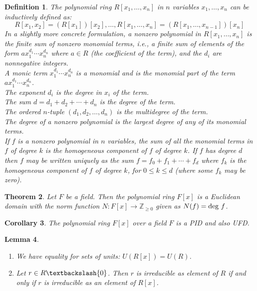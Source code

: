 \documentclass[a4paper,8pt]{article}
\newcommand{\Z}{\mathbb{Z}}
\newcommand{\hlt}[1]{\textit{{\color{blue}#1}}}
\newcommand{\degs}[1]{\textnormal{deg}#1}
\theoremstyle{theorem}
\newtheorem{theorem}{Theorem}[subsection]
\newtheorem{corollary}[theorem]{Corollary}
\newtheorem{lemma}[theorem]{Lemma}
\newtheorem{definition}[theorem]{Definition}
\begin{document}
\begin{definition}
The polynomial ring $R[x_1, \ldots, x_n]$ in $n$ variables $x_1, \ldots, x_n$ can be inductively defined as:
\begin{equation}
R[x_1, x_2] = (R[x_1])[x_2], \ldots, R[x_1, \ldots, x_n] = (R[x_1, \ldots, x_{n-1}])[x_n] \nonumber
\end{equation}
In a slightly more concrete formulation, a nonzero polynomial in $R[x_1, \ldots, x_n]$ is the finite sum of nonzero monomial terms, i.e., a finite sum of elements of the form $ax_1^{d_1} \cdots x_n^{d_n}$ where $a\in R$ (the coefficient of the term), and the $d_i$ are nonnegative integers.\\
A monic term $x_1^{d_1} \cdots x_n^{d_n}$ is a \hlt{monomial} and is the monomial part of the term $ax_1^{d_1} \cdots x_n^{d_n}$.\\
The exponent $d_i$ is the \hlt{degree in $x_i$} of the term.\\
The sum $d=d_1 + d_2 + \cdots + d_n$ is the \hlt{degree of the term}.\\
The ordered $n$-tuple $(d_1, d_2, \ldots, d_n)$ is the \hlt{multidegree of the term}.\\
The \hlt{degree of a nonzero polynomial} is the largest degree of any of its monomial terms.\\
If $f$ is a nonzero polynomial in $n$ variables, the sum of all the monomial terms in $f$ of degree $k$ is the \hlt{homogeneous component} of $f$ of degree $k$. If $f$ has degree $d$ then $f$ may be written uniquely as the sum $f = f_0 + f_1 + \cdots + f_d$ where $f_k$ is the homogeneous component of $f$ of degree $k$, for $0 \leq k \leq d$ (where some $f_k$ may be zero).
\end{definition}

\begin{theorem}
Let $F$ be a field. Then the polynomial ring $F[x]$ is a Euclidean domain with the norm function $N:F[x] \rightarrow \Z_{\geq 0}$ given as $N(f) = \degs \ f$.
\end{theorem}

\begin{corollary}
The polynomial ring $F[x]$ over a field $F$ is a PID and also UFD.
\end{corollary}

\begin{lemma}
\begin{enumerate}[label=(\roman*)]
\item We have equality for sets of units: $U(R[x]) = U(R)$.
\item Let $r \in R \textbackslash \{0\}$. Then $r$ is irreducible as element of $R$ if and only if $r$ is irreducible as an element of $R[x]$.
\end{enumerate}
\end{lemma}
\end{document}
